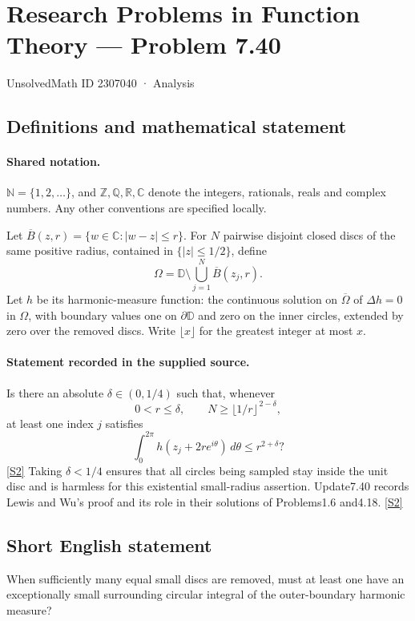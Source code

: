 \documentclass[11pt]{article}
\newcommand{\sref}[2]{\hyperlink{source:#1:#2}{[S#2]}}
\begin{document}
\setcounter{section}{2307039}
\section{Research Problems in Function Theory — Problem 7.40}\label{2307040}
{\small\sffamily UnsolvedMath ID 2307040 · Analysis}
\subsection{Definitions and mathematical statement}

\paragraph{Shared notation.}$\mathbb N=\{1,2,\ldots\}$, and $\mathbb Z,\mathbb Q,\mathbb R,\mathbb C$ denote the integers, rationals, reals and complex numbers. Any other conventions are specified locally.


Let $\overline B(z,r)=\{w\in\mathbb C:|w-z|\le r\}$. For $N$ pairwise disjoint closed discs of the same positive radius, contained in $\{|z|\le1/2\}$, define
\[\Omega=\mathbb D\setminus\bigcup_{j=1}^N\overline B(z_j,r).\]
Let $h$ be its harmonic-measure function: the continuous solution on $\overline\Omega$ of $\Delta h=0$ in $\Omega$, with boundary values one on $\partial\mathbb D$ and zero on the inner circles, extended by zero over the removed discs. Write $\lfloor x\rfloor$ for the greatest integer at most $x$.

\paragraph{Statement recorded in the supplied source.}
Is there an absolute $\delta\in(0,1/4)$ such that, whenever
\[0<r\le\delta,\qquad N\ge\lfloor1/r\rfloor^{\,2-\delta},\]
at least one index $j$ satisfies
\[\int_0^{2\pi}h(z_j+2re^{i\theta})\,d\theta\le r^{2+\delta}?\] \sref{2307040}{2}
Taking $\delta<1/4$ ensures that all circles being sampled stay inside the unit disc and is harmless for this existential small-radius assertion. Update7.40 records Lewis and Wu's proof and its role in their solutions of Problems1.6 and4.18. \sref{2307040}{2}
\subsection{Short English statement}
When sufficiently many equal small discs are removed, must at least one have an exceptionally small surrounding circular integral of the outer-boundary harmonic measure?
\end{document}
